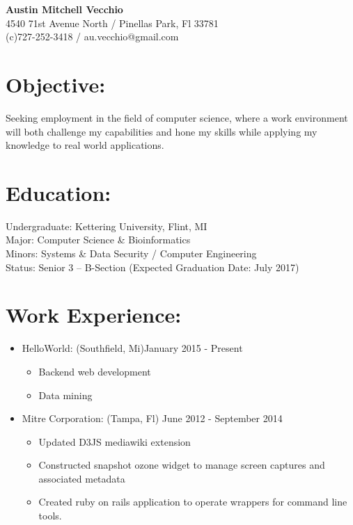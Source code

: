 \documentclass{res}
\begin{document}
\begin{center}
\LARGE{\textbf{Austin Mitchell Vecchio}}\\
\normalsize{
4540 71st Avenue North / Pinellas Park, Fl 33781\\
(c)727-252-3418 / au.vecchio@gmail.com
}
\end{center}

\section{Objective:}
Seeking employment in the field of computer science, where a work environment will both challenge my capabilities and hone my skills while applying my knowledge to real world applications.\\

\section{Education:}
Undergraduate: Kettering University, Flint, MI\\
Major: Computer Science \& Bioinformatics\\
Minors: Systems \& Data Security / Computer Engineering\\
Status: Senior 3 – B-Section (Expected Graduation Date: July 2017)\\

\section{Work Experience:}
\begin{itemize}
\item HelloWorld: (Southfield, Mi)\hfill January 2015 - Present
\begin{itemize}[label=$\circ$]
\item Backend web development
\item Data mining
\end{itemize}
\item Mitre Corporation: (Tampa, Fl) \hfill June 2012 - September 2014
\begin{itemize}[label=$\circ$]
\item Updated D3JS mediawiki extension
\item Constructed snapshot ozone widget to manage screen captures and associated metadata
\item Created ruby on rails application to operate wrappers for command line tools.
\end{itemize}
\end{itemize}
\end{document}
